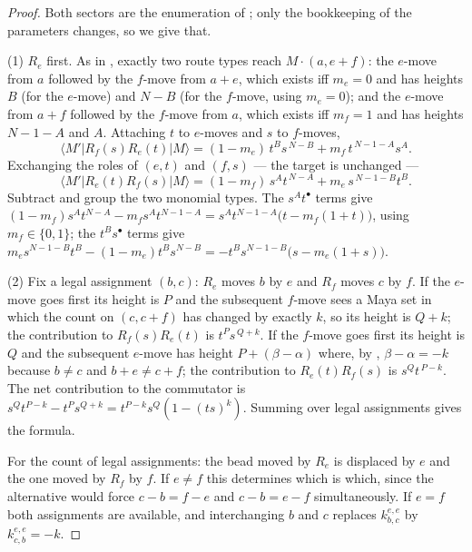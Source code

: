 \documentclass[11pt]{article}
\theoremstyle{definition}
\begin{document}
\begin{proof}
Both sectors are the enumeration of \cite[Thm.~2.3]{Clio0907}; only the bookkeeping of the
parameters changes, so we give that.

(1) $R_e$ first.  As in \cite[Thm.~2.3, Step~2]{Clio0907}, exactly two route types reach
$M\cdot(a,e+f)$: the $e$-move from $a$ followed by the $f$-move from $a+e$, which exists
iff $m_e=0$ and has heights $B$ (for the $e$-move) and $N-B$ (for the $f$-move, using
$m_e=0$); and the $e$-move from $a+f$ followed by the $f$-move from $a$, which exists iff
$m_f=1$ and has heights $N-1-A$ and $A$.  Attaching $t$ to $e$-moves and $s$ to $f$-moves,
\[
  \langle M'|R_f(s)R_e(t)|M\rangle=(1-m_e)\,t^{B}s^{\,N-B}+m_f\,t^{\,N-1-A}s^{A}.
\]
Exchanging the roles of $(e,t)$ and $(f,s)$ --- the target is unchanged ---
\[
  \langle M'|R_e(t)R_f(s)|M\rangle=(1-m_f)\,s^{A}t^{\,N-A}+m_e\,s^{\,N-1-B}t^{B}.
\]
Subtract and group the two monomial types.  The $s^{A}t^{\bullet}$ terms give
$(1-m_f)s^At^{N-A}-m_f s^At^{N-1-A}=s^At^{N-1-A}\bigl(t-m_f(1+t)\bigr)$, using
$m_f\in\{0,1\}$; the $t^{B}s^{\bullet}$ terms give
$m_es^{N-1-B}t^{B}-(1-m_e)t^Bs^{N-B}=-t^Bs^{N-1-B}\bigl(s-m_e(1+s)\bigr)$.

(2) Fix a legal assignment $(b,c)$: $R_e$ moves $b$ by $e$ and $R_f$ moves $c$ by $f$.  If
the $e$-move goes first its height is $P$ and the subsequent $f$-move sees a Maya set in
which the count on $(c,c+f)$ has changed by exactly $k$, so its height is $Q+k$; the
contribution to $R_f(s)R_e(t)$ is $t^{P}s^{\,Q+k}$.  If the $f$-move goes first its height
is $Q$ and the subsequent $e$-move has height $P+(\beta-\alpha)$ where, by
\cite[Lem.~2.1]{Clio0907}, $\beta-\alpha=-k$ because $b\neq c$ and $b+e\neq c+f$; the
contribution to $R_e(t)R_f(s)$ is $s^{Q}t^{\,P-k}$.  The net contribution to the
commutator is $s^{Q}t^{P-k}-t^{P}s^{Q+k}=t^{P-k}s^{Q}(1-(ts)^{k})$.  Summing over legal
assignments gives the formula.

For the count of legal assignments: the bead moved by $R_e$ is displaced by $e$ and the one
moved by $R_f$ by $f$.  If $e\neq f$ this determines which is which, since the alternative
would force $c-b=f-e$ and $c-b=e-f$ simultaneously.  If $e=f$ both assignments are
available, and interchanging $b$ and $c$ replaces $k^{e,e}_{b,c}$ by $k^{e,e}_{c,b}=-k$.
\end{proof}
\end{document}
